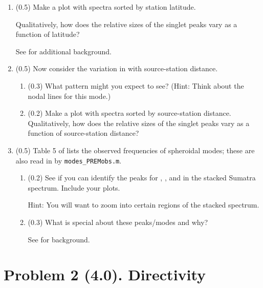 \documentclass[11pt,titlepage,fleqn]{article}
\begin{document}
\begin{enumerate}

\item (0.5) Make a plot with   spectra sorted by station latitude.

Qualitatively, how does the relative sizes of the singlet peaks vary as a function of latitude?

See \citet[][Figure 3]{SSteinOkal2007} for additional background.


\item (0.5) Now consider the variation in  with source-station distance.
%
\begin{enumerate}
\item (0.3) What pattern might you expect to see? (Hint: Think about the nodal lines for this mode.)

\item (0.2) Make a plot with   spectra sorted by source-station distance. Qualitatively, how does the relative sizes of the singlet peaks vary as a function of source-station distance?
\end{enumerate}


\item (0.5) Table 5 of \citet{PREM} lists the observed frequencies of spheroidal modes; these are also read in by \verb+modes_PREMobs.m+.
%
\begin{enumerate}
\item (0.2) See if you can identify the peaks for , , and  in the stacked Sumatra spectrum. Include your plots.

Hint: You will want to zoom into certain regions of the stacked spectrum.

\item (0.3) What is special about these peaks/modes and why?

See \citet[][p. 106]{SteinWysession} for background.
\end{enumerate}

\end{enumerate}


\pagebreak
\section*{Problem 2 (4.0). Directivity}
\end{document}
